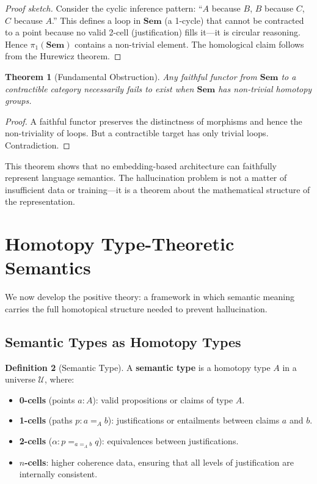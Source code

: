 \documentclass[11pt,a4paper,twocolumn]{article}
\theoremstyle{plain}
\newtheorem{theorem}{Theorem}[section]
\theoremstyle{definition}
\newtheorem{definition}[theorem]{Definition}
\newcommand{\Sem}{\mathbf{Sem}}
\begin{document}
\begin{proof}[Proof sketch]
Consider the cyclic inference pattern: ``$A$ because $B$, $B$ because $C$, $C$ because $A$.'' This defines a loop in $\Sem$ (a 1-cycle) that cannot be contracted to a point because no valid 2-cell (justification) fills it---it is circular reasoning. Hence $\pi_1(\Sem)$ contains a non-trivial element. The homological claim follows from the Hurewicz theorem.
\end{proof}

\begin{theorem}[Fundamental Obstruction]\label{thm:obstruction}
Any faithful functor from $\Sem$ to a contractible category necessarily fails to exist when $\Sem$ has non-trivial homotopy groups.
\end{theorem}

\begin{proof}
A faithful functor preserves the distinctness of morphisms and hence the non-triviality of loops. But a contractible target has only trivial loops. Contradiction.
\end{proof}

This theorem shows that no embedding-based architecture can faithfully represent language semantics. The hallucination problem is not a matter of insufficient data or training---it is a theorem about the mathematical structure of the representation.

\section{Homotopy Type-Theoretic Semantics}\label{sec:hott}

We now develop the positive theory: a framework in which semantic meaning carries the full homotopical structure needed to prevent hallucination.

\subsection{Semantic Types as Homotopy Types}

\begin{definition}[Semantic Type]\label{def:semtype}
A \textbf{semantic type} is a homotopy type $A$ in a universe $\mathcal{U}$, where:
\begin{itemize}[nosep]
  \item \textbf{0-cells} (points $a : A$): valid propositions or claims of type $A$.
  \item \textbf{1-cells} (paths $p : a =_A b$): justifications or entailments between claims $a$ and $b$.
  \item \textbf{2-cells} ($\alpha : p =_{a =_A b} q$): equivalences between justifications.
  \item \textbf{$n$-cells}: higher coherence data, ensuring that all levels of justification are internally consistent.
\end{itemize}
\end{definition}
\end{document}
